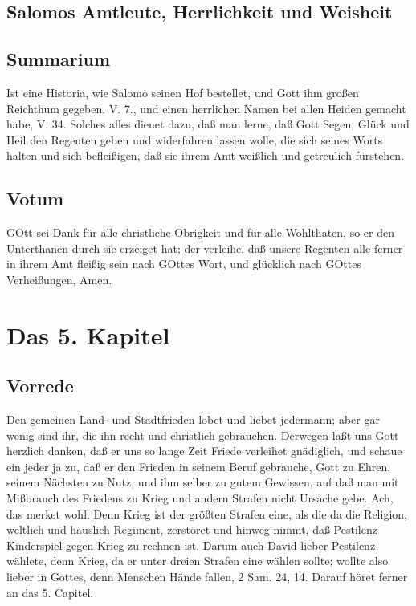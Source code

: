 \section{Salomos Amtleute, Herrlichkeit und Weisheit}

\section{Summarium}

Ist eine Historia, wie Salomo seinen Hof bestellet, und Gott ihm großen Reichthum gegeben, V. 7., und einen herrlichen Namen bei allen Heiden gemacht habe, V. 34. Solches alles dienet dazu, daß man lerne, daß Gott Segen, Glück und Heil den Regenten geben und widerfahren lassen wolle, die sich seines Worts halten und sich befleißigen, daß sie ihrem Amt weißlich und getreulich fürstehen.

\section{Votum}

GOtt sei Dank für alle christliche Obrigkeit und für alle Wohlthaten, so er den Unterthanen durch sie erzeiget hat; der verleihe, daß unsere Regenten alle ferner in ihrem Amt fleißig sein nach GOttes Wort, und glücklich nach GOttes Verheißungen, Amen.

\chapter{Das 5. Kapitel}

\section{Vorrede}

Den gemeinen Land- und Stadtfrieden lobet und liebet jedermann; aber gar wenig sind ihr, die ihn recht und christlich gebrauchen. Derwegen laßt uns Gott herzlich danken, daß er uns so lange Zeit Friede verleihet gnädiglich, und schaue ein jeder ja zu, daß er den Frieden in seinem Beruf gebrauche, Gott zu Ehren, seinem Nächsten zu Nutz, und ihm selber zu gutem Gewissen, auf daß man mit Mißbrauch des Friedens zu Krieg und andern Strafen nicht Ursache gebe. Ach, das merket wohl. Denn Krieg ist der größten Strafen eine, als die da die Religion, weltlich und häuslich Regiment, zerstöret und hinweg nimmt, daß Pestilenz Kinderspiel gegen Krieg zu rechnen ist. Darum auch David lieber Pestilenz wählete, denn Krieg, da er unter dreien Strafen eine wählen sollte; wollte also lieber in Gottes, denn Menschen Hände fallen, 2 Sam. 24, 14. Darauf höret ferner an das 5. Capitel.

